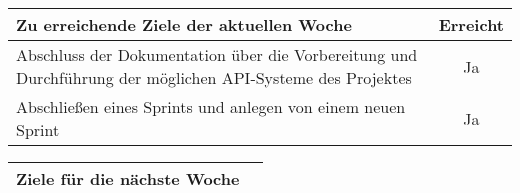 \begin{tabularx}{\textwidth}{Xc}
    \arrayrulecolor{OliveGreen}
    \toprule
    {\bfseries Zu erreichende Ziele der aktuellen Woche} & {\bfseries Erreicht} \\
    \midrule[2pt]
    Abschluss der Dokumentation über die Vorbereitung und Durchführung der
    möglichen API-Systeme des Projektes  &  Ja  \\
    \rowcolor{OliveGreen!15}
    Abschließen eines Sprints und anlegen von einem neuen Sprint  &  Ja  \\
    \bottomrule[2pt]
\end{tabularx}
%
\vspace{1cm}
%
\begin{tabularx}{\textwidth}{Xc}
    \arrayrulecolor{OliveGreen}
    \toprule
    {\bfseries Ziele für die nächste Woche}              &                      \\
    \midrule[2pt]
    \midrule[2pt]
\end{tabularx}
